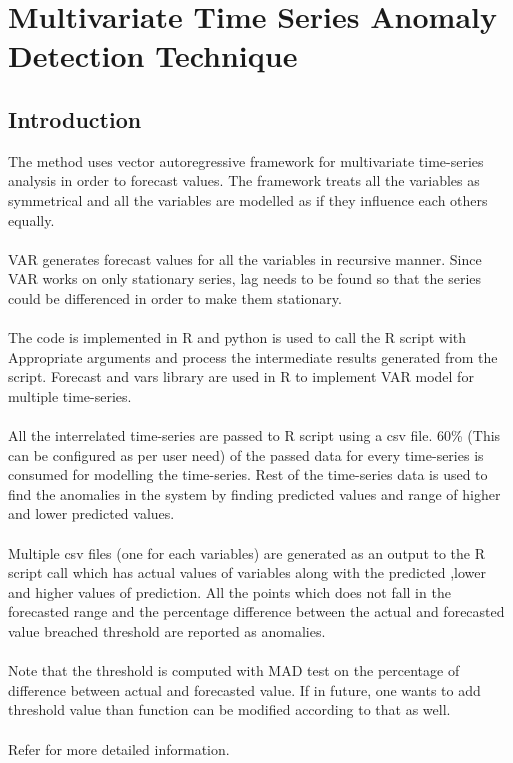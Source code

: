 \chapter{Multivariate Time Series Anomaly Detection Technique}

\section{Introduction}

The method uses vector autoregressive framework for multivariate time-series analysis
in order to forecast values. The framework treats all the variables as symmetrical
and all the variables are modelled as if they influence each others equally.\\
\\
VAR generates forecast values for all the variables in recursive manner. Since VAR 
works on only stationary series, lag needs to be found so that the series could be
differenced in order to make them stationary.\\
\\
The code is implemented in R and python is used to call the R script with Appropriate 
arguments and process the intermediate results generated from the script. Forecast and 
vars library are used in R to implement VAR model for multiple time-series.\\
\\
All the interrelated time-series are passed to R script using a csv file. 60\% 
(This can be configured as per user need) of the passed data for every time-series 
is consumed for modelling the time-series. Rest of the time-series data is used to 
find the anomalies in the system by finding predicted values and range of higher and lower
predicted values.\\
\\
Multiple csv files (one for each variables) are generated as an output to the R script 
call which has actual values of variables along with the predicted ,lower and higher 
values of prediction. All the points which does not fall in the forecasted range and 
the percentage difference between the actual and forecasted value breached threshold 
are reported as anomalies.\\
\\
Note that the threshold is computed with MAD test on the percentage of difference between actual and forecasted value.
If in future, one wants to add threshold value than function can be modified according to that as well.\\
\\
Refer \cite{var} for more detailed information.

